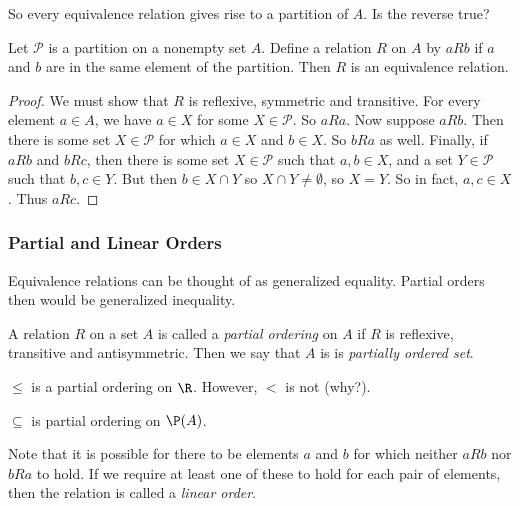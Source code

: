 So every equivalence relation gives rise to a partition of $A$.  Is the reverse true?

\begin{theorem}
 Let $\mathcal{P}$ is a partition on a nonempty set $A$.  Define a relation $R$ on $A$ by $aRb$ if $a$ and $b$ are in the same element of the partition.  Then $R$ is an equivalence relation.
\end{theorem}

\begin{proof}
 We must show that $R$ is reflexive, symmetric and transitive.  For every element $a \in A$, we have $a \in X$ for some $X \in \mathcal{P}$.  So $a R a$.  Now suppose $a R b$.  Then there is some set $X \in \mathcal{P}$ for which $a \in X$ and $b \in X$.  So $b R a$ as well.  Finally, if $aR b$ and $b R c$, then there is some set $X \in \mathcal{P}$ such that $a, b \in X$, and a set $Y \in \mathcal{P}$ such that $b, c \in Y$.  But then $b \in X \cap Y$ so $X \cap Y \ne \emptyset$, so $X = Y$.  So in fact, $a, c \in X$.  Thus $a R c$.
\end{proof}

\subsubsection*{Partial and Linear Orders}

Equivalence relations can be thought of as generalized equality.  Partial orders then would be generalized inequality.

\begin{definition}
 A relation $R$ on a set $A$ is called a {\em partial ordering} on $A$ if $R$ is reflexive, transitive and antisymmetric.  Then we say that $A$ is is {\em partially ordered set}.
\end{definition}

\begin{example}
 $\le$ is a partial ordering on $\R$.  However, $<$ is not (why?).
 
 $\subseteq$ is partial ordering on $\P(A)$.
\end{example}

Note that it is possible for there to be elements $a$ and $b$ for which neither $aRb$ nor $bRa$ to hold.  If we require at least one of these to hold for each pair of elements, then the relation is called a {\em linear order}.  
